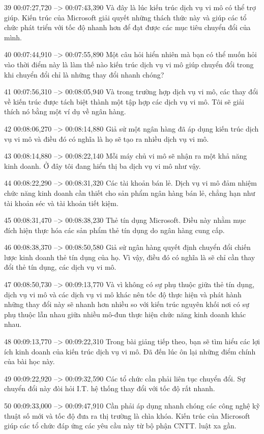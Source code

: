 39
00:07:27,720 --> 00:07:43,390
Và đây là lúc kiến ​​trúc dịch vụ vi mô có thể trợ giúp.  Kiến trúc của Microsoft giải quyết những thách thức này và giúp các tổ chức phát triển với tốc độ nhanh hơn để đạt được các mục tiêu chuyển đổi của mình.

40
00:07:44,910 --> 00:07:55,890
Một câu hỏi hiển nhiên mà bạn có thể muốn hỏi vào thời điểm này là làm thế nào kiến ​​trúc dịch vụ vi mô giúp chuyển đổi trong khi chuyển đổi chỉ là những thay đổi nhanh chóng?

41
00:07:56,310 --> 00:08:05,940
Và trong trường hợp dịch vụ vi mô, các thay đổi về kiến ​​trúc được tách biệt thành một tập hợp các dịch vụ vi mô.  Tôi sẽ giải thích nó bằng một ví dụ về ngân hàng.

42
00:08:06,270 --> 00:08:14,880
Giả sử một ngân hàng đã áp dụng kiến ​​trúc dịch vụ vi mô và điều đó có nghĩa là họ sẽ tạo ra nhiều dịch vụ vi mô.

43
00:08:14,880 --> 00:08:22,140
Mỗi máy chủ vi mô sẽ nhận ra một khả năng kinh doanh.  Ở đây tôi đang hiển thị ba dịch vụ vi mô như vậy.

44
00:08:22,290 --> 00:08:31,320
Các tài khoản bán lẻ.  Dịch vụ vi mô đảm nhiệm chức năng kinh doanh cần thiết cho sản phẩm ngân hàng bán lẻ, chẳng hạn như tài khoản séc và tài khoản tiết kiệm.

45
00:08:31,470 --> 00:08:38,230
Thẻ tín dụng Microsoft.  Điều này nhằm mục đích hiện thực hóa các sản phẩm thẻ tín dụng do ngân hàng cung cấp.

46
00:08:38,370 --> 00:08:50,580
Giả sử ngân hàng quyết định chuyển đổi chiến lược kinh doanh thẻ tín dụng của họ.  Vì vậy, điều đó có nghĩa là sẽ chỉ cần thay đổi thẻ tín dụng, các dịch vụ vi mô.

47
00:08:50,730 --> 00:09:13,770
Và vì không có sự phụ thuộc giữa thẻ tín dụng, dịch vụ vi mô và các dịch vụ vi mô khác nên tốc độ thực hiện và phát hành những thay đổi này sẽ nhanh hơn nhiều so với kiến ​​trúc nguyên khối nơi có sự phụ thuộc lẫn nhau giữa nhiều mô-đun thực hiện  chức năng kinh doanh khác nhau.

48
00:09:13,770 --> 00:09:22,310
Trong bài giảng tiếp theo, bạn sẽ tìm hiểu các lợi ích kinh doanh của kiến ​​trúc dịch vụ vi mô.  Đã đến lúc ôn lại những điểm chính của bài học này.

49
00:09:22,920 --> 00:09:32,590
Các tổ chức cần phải liên tục chuyển đổi.  Sự chuyển đổi này đòi hỏi I.T.  hệ thống thay đổi với tốc độ rất nhanh.

50
00:09:33,000 --> 00:09:47,910
Cần phải áp dụng nhanh chóng các công nghệ kỹ thuật số mới và tốc độ đưa ra thị trường là chìa khóa. Kiến trúc của Microsoft giúp các tổ chức đáp ứng các yêu cầu này từ bộ phận CNTT.  luật xa gần.


